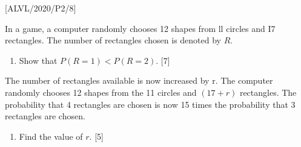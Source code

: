 \item {[}ALVL/2020/P2/8{]}

In a game, a computer randomly chooses 12 shapes from ll circles and
I7 rectangles. The number of rectangles chosen is denoted by $R$.
\begin{enumerate}
\item Show that $P\left(R=1\right)<P\left(R=2\right)$. \hfill{}{[}7{]}
\end{enumerate}
The number of rectangles available is now increased by r. The computer
randomly chooses 12 shapes from the 11 circles and $\left(17+r\right)$
rectangles. The probability that 4 rectangles are chosen is now 15
times the probability that 3 rectangles are chosen.
\begin{enumerate}
\item Find the value of $r$. \hfill{}{[}5{]}
\end{enumerate}
